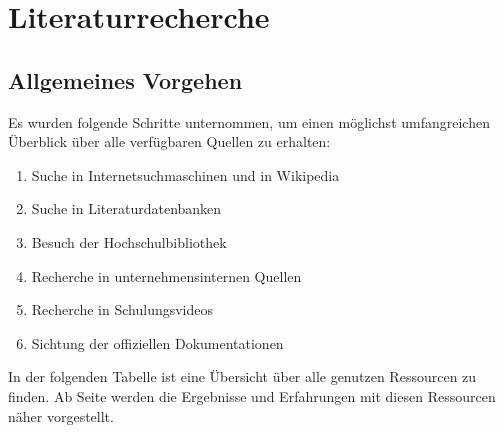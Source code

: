 \section*{Literaturrecherche}

\subsection*{Allgemeines Vorgehen}

Es wurden folgende Schritte unternommen, um einen möglichst umfangreichen Überblick über alle verfügbaren Quellen zu erhalten:
\begin{enumerate}
\item Suche in Internetsuchmaschinen und in Wikipedia
\item Suche in Literaturdatenbanken
\item Besuch der Hochschulbibliothek
\item Recherche in unternehmensinternen Quellen
\item Recherche in Schulungsvideos
\item Sichtung der offiziellen Dokumentationen
\end{enumerate}
In der folgenden Tabelle ist eine Übersicht über alle genutzen Ressourcen zu finden. Ab Seite \pageref{startdetails} werden die Ergebnisse und Erfahrungen mit diesen Ressourcen näher vorgestellt.\\

